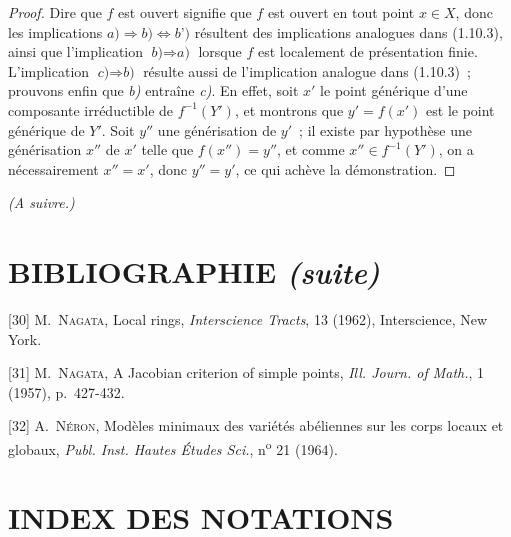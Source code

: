 \begin{proof}
Dire que $f$ est ouvert signifie que $f$ est ouvert en tout point $x\in X$,
donc les implications
$\textit{a)}\Rightarrow\textit{b)}\Leftrightarrow\textit{b')}$ résultent des
implications analogues dans (1.10.3), ainsi que l'implication
$\textit{b)}\Rightarrow\textit{a)}$ lorsque $f$ est localement de présentation
finie. L'implication $\textit{c)}\Rightarrow\textit{b)}$ résulte aussi de
l'implication analogue dans (1.10.3)~; prouvons enfin que \emph{b)} entraîne \emph{c)}. En
effet, soit $x'$ le point générique d'une composante
irréductible de $f^{-1}(Y')$, et montrons que $y'=f(x')$ est le point générique
de $Y'$. Soit $y''$ une générisation de $y'$~; il existe par hypothèse une
générisation $x''$ de $x'$ telle que $f(x'')=y''$, et comme
$x''\in f^{-1}(Y')$, on a nécessairement $x''=x'$, donc $y''=y'$, ce qui
achève la démonstration.
\end{proof}

\begin{center}
\emph{(A suivre.)}
\end{center}

\clearpage
{}
{}
\section*{BIBLIOGRAPHIE \textit{(suite)}}

\begingroup
\small
\setlength{\parindent}{0pt}
\setlength{\parskip}{3pt}
[30] M.~\textsc{Nagata}, Local rings, \emph{Interscience Tracts}, 13 (1962),
Interscience, New York.

[31] M.~\textsc{Nagata}, A Jacobian criterion of simple points,
\emph{Ill. Journ. of Math.}, 1 (1957), p.~427-432.

[32] A.~\textsc{Néron}, Modèles minimaux des variétés abéliennes sur les corps
locaux et globaux, \emph{Publ. Inst. Hautes Études Sci.}, n\textsuperscript{o}
21 (1964).

\clearpage
{}
{}
\section*{INDEX DES NOTATIONS}

